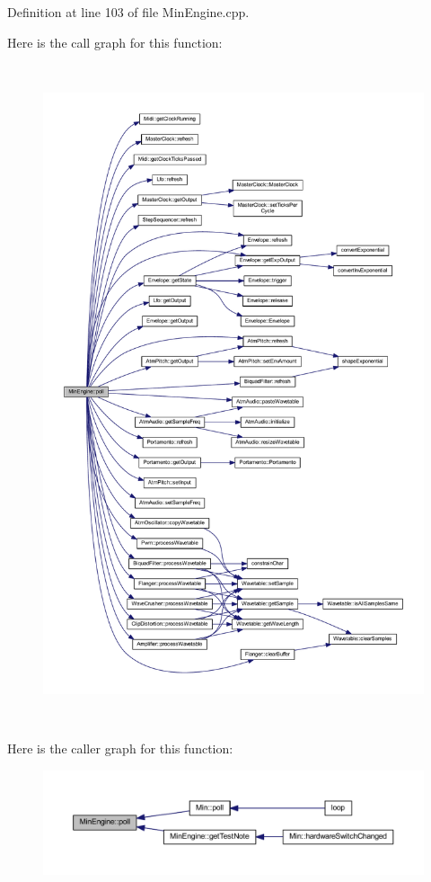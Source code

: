 Definition at line 103 of file Min\+Engine.\+cpp.

Here is the call graph for this function\+:
\nopagebreak
\begin{figure}[H]
\begin{center}
\leavevmode
\includegraphics[height=550pt]{d4/d0f/class_min_engine_af0b91eca44954cb677808c3d24659596_cgraph}
\end{center}
\end{figure}
Here is the caller graph for this function\+:
\nopagebreak
\begin{figure}[H]
\begin{center}
\leavevmode
\includegraphics[width=350pt]{d4/d0f/class_min_engine_af0b91eca44954cb677808c3d24659596_icgraph}
\end{center}
\end{figure}
\mbox{\label{class_min_engine_ac76abe71fbd84b163b68fc7b12fb1a26}} 
